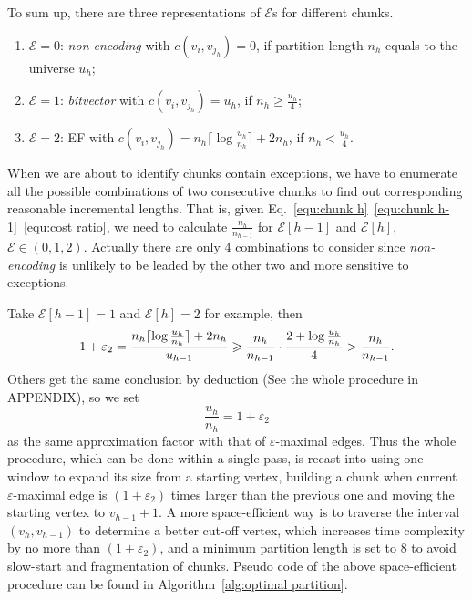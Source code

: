 \documentclass[runningheads,a4paper]{llncs}
\begin{document}
To sum up, there are three representations of $ \mathcal{E} $s for different chunks.
\begin{enumerate}
	\item $ \mathcal{E}=0 $: \textit{non-encoding} with $c\left(v_{i}, v_{j_{h}}\right)=0$, if partition length $n_{h}$ equals to the universe $u_{h}$;
	\item $ \mathcal{E}=1 $: \textit{bitvector} with $c\left(v_{i}, v_{j_{h}}\right)=u_{h}$, if $n_{h}\geqslant \frac{u_{h}}{4}$;
	\item $ \mathcal{E}=2 $: EF with $c\left(v_{i}, v_{j_{h}}\right)=n_{h}\lceil\log \frac{u_{h}}{n_{h}}\rceil+2n_{h}$, if $n_{h}<\frac{u_{h}}{4}$.
\end{enumerate}
When we are about to identify chunks contain exceptions, we have to enumerate all the possible combinations of two consecutive chunks to find out corresponding reasonable incremental lengths.
That is, given Eq.~\eqref{equ:chunk h}~\eqref{equ:chunk h-1}~\eqref{equ:cost ratio}, we need to calculate $ \frac{n_h}{n_{h-1}} $ for $ \mathcal{E}[h-1] $ and $ \mathcal{E}[h] $, $ \mathcal{E} \in (0, 1, 2) $.
Actually there are only 4 combinations to consider since \textit{non-encoding} is unlikely to be leaded by the other two and more sensitive to exceptions.

Take $ \mathcal{E}[h-1]=1 $ and $ \mathcal{E}[h]=2 $ for example, then
\begin{displaymath}
\noindent
1+\varepsilon_{2}=\frac{n_{h}\lceil\log \frac{u_{h}}{n_{h}}\rceil+2n_{h}}{u_{h-1}}\geqslant \frac{n_{h}}{n_{h-1}}\cdot \frac{2+\log \frac{u_{h}}{n_{h}}}{4}>\frac{n_{h}}{n_{h-1}}.
\end{displaymath}
Others get the same conclusion by deduction (See the whole procedure in APPENDIX), so we set
\begin{equation}
\frac{u_{h}}{n_{h}}=1+\varepsilon_2
\end{equation}
as the same approximation factor with that of $\varepsilon$-maximal edges.
Thus the whole procedure, which can be done within a single pass, is recast into using one window to expand its size from a starting vertex, building a chunk when current $\varepsilon$-maximal edge is $\left(1+\varepsilon_{2}\right)$ times larger than the previous one and moving the starting vertex to $v_{h-1}+1$.
A more space-efficient way is to traverse the interval $\left(v_{h}, v_{h-1}\right)$ to determine a better cut-off vertex, which increases time complexity by no more than $\left(1+\varepsilon_{2}\right)$, and a minimum partition length is set to 8 to avoid slow-start and fragmentation of chunks.
Pseudo code of the above space-efficient procedure can be found in Algorithm~\ref{alg:optimal partition}.
\end{document}
